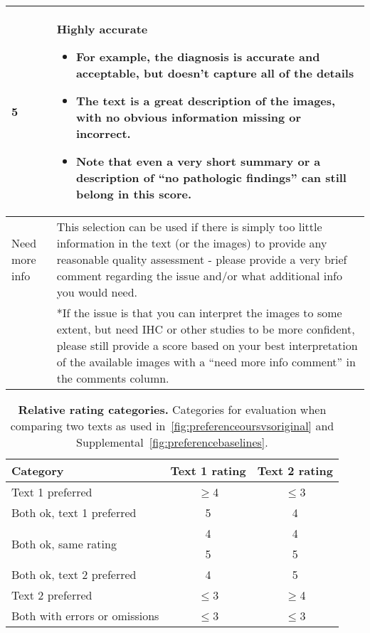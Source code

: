\documentclass[11pt]{article}
\begin{document}
\begin{table}[h]
\begin{tabular}{m{1.5cm} p{14cm}}
\hline
5 & Highly accurate
\begin{itemize}
\setlength{\itemsep}{0pt}
    \item For example, the diagnosis is accurate and acceptable, but doesn't capture all of the details
    \item The text is a great description of the images, with no obvious information missing or incorrect.
    \item Note that even a very short summary or a description of “no pathologic findings” can still belong in this score.
\end{itemize} \\
\hline
Need more info & This selection can be used if there is simply too little information in the text (or the images) to provide any reasonable quality assessment - please provide a very brief comment regarding the issue and/or what additional info you would need. \\
& *If the issue is that you can interpret the images to some extent, but need IHC or other studies to be more confident, please still provide a score based on your best interpretation of the available images with a “need more info comment” in the comments column. \\
\bottomrule
\end{tabular}
\label{tab:rubric}
\end{table}

\begin{table}[h]
\small
\centering
\caption{\small \textbf{Relative rating categories.} Categories for evaluation when comparing two texts as used in~\autoref{fig:preferenceoursvsoriginal} and Supplemental~\autoref{fig:preferencebaselines}.}
\begin{tabular}{lcc}
\toprule
\textbf{Category} & \textbf{Text 1 rating} & \textbf{Text 2 rating} \\
\midrule
Text 1 preferred & $\geq$4 & $\leq$3 \\
\hline
Both ok, text 1 preferred & 5 & 4 \\
\hline
\multirow{2}{*}{Both ok, same rating} & 4 & 4 \\
& 5 & 5 \\
\hline
Both ok, text 2 preferred & 4 & 5 \\
\hline
Text 2 preferred & $\leq$3 & $\geq$4 \\
\hline
Both with errors or omissions & $\leq$3 & $\leq$3 \\
\bottomrule
\end{tabular}
\label{tab:comparecategories}
\end{table}
\end{document}
